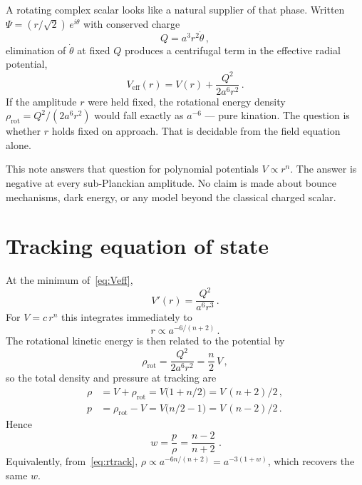 \documentclass[aps,prd,twocolumn,superscriptaddress,nofootinbib,10pt]{revtex4-2}
\begin{document}
A rotating complex scalar looks like a natural supplier of that phase. Written
$\Psi=(r/\sqrt{2})\,e^{i\theta}$ with conserved charge
\begin{equation}
  Q = a^{3} r^{2}\dot\theta\,,
\end{equation}
elimination of $\dot\theta$ at fixed $Q$ produces a centrifugal term in the effective radial
potential,
\begin{equation}
  V_{\mathrm{eff}}(r)
  = V(r) + \frac{Q^{2}}{2 a^{6} r^{2}}\,.
  \label{eq:Veff}
\end{equation}
If the amplitude $r$ were held fixed, the rotational energy density
$\rho_{\mathrm{rot}}=Q^{2}/(2a^{6}r^{2})$ would fall exactly as $a^{-6}$ --- pure kination.
The question is whether $r$ holds fixed on approach. That is decidable from the field equation
alone.

This note answers that question for polynomial potentials $V\propto r^{n}$. The answer is
negative at every sub-Planckian amplitude. No claim is made about bounce mechanisms, dark energy,
or any model beyond the classical charged scalar.

\section{Tracking equation of state}\label{sec:tracking}

At the minimum of~\eqref{eq:Veff},
\begin{equation}
  V'(r) = \frac{Q^{2}}{a^{6} r^{3}}\,.
  \label{eq:min}
\end{equation}
For $V=c\,r^{n}$ this integrates immediately to
\begin{equation}
  r \propto a^{-6/(n+2)}\,.
  \label{eq:rtrack}
\end{equation}
The rotational kinetic energy is then related to the potential by
\begin{equation}
  \rho_{\mathrm{rot}}
  = \frac{Q^{2}}{2 a^{6} r^{2}}
  = \frac{n}{2}\,V\,,
\end{equation}
so the total density and pressure at tracking are
\begin{align}
  \rho &= V + \rho_{\mathrm{rot}} = V\bigl(1+n/2\bigr)
       = V\,(n+2)/2\,, \\
  p    &= \rho_{\mathrm{rot}} - V = V\bigl(n/2-1\bigr)
       = V\,(n-2)/2\,.
\end{align}
Hence
\begin{equation}
  \boxed{\,w = \frac{p}{\rho} = \frac{n-2}{n+2}\,}\,.
  \label{eq:w}
\end{equation}
Equivalently, from~\eqref{eq:rtrack},
$\rho\propto a^{-6n/(n+2)}=a^{-3(1+w)}$, which recovers the same $w$.
\end{document}
